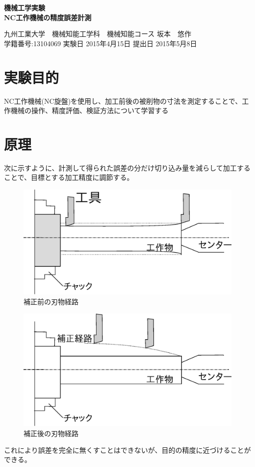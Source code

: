 \documentclass[a4j,twoside,openright,11pt]{jsarticle}
\begin{document}
\begin{screen}
\huge
\begin{center}
{\bf 機械工学実験\\NC工作機械の精度誤差計測}\\
\end{center}

\normalsize
\begin{flushright}
九州工業大学　機械知能工学科　機械知能コース  坂本　悠作\\学籍番号:13104069 \hspace{0.2in}実験日 2015年4月15日  提出日 2015年5月8日
\end{flushright}
\end{screen}


\section{実験目的}
NC工作機械(NC旋盤)を使用し、加工前後の被削物の寸法を測定することで、工作機械の操作、精度評価、検証方法について学習する
\section{原理}
次に示すように、計測して得られた誤差の分だけ切り込み量を減らして加工することで、目標とする加工精度に調節する。
\begin{figure}[htbp]
\begin{center}
\includegraphics[width=12cm]{hoseimae.eps}
\end{center}
\caption{補正前の刃物経路}
\end{figure}
\begin{figure}[htbp]
\begin{center}
\includegraphics[width=12cm]{hoseigo.eps}
\end{center}
\caption{補正後の刃物経路}
\end{figure}
これにより誤差を完全に無くすことはできないが、目的の精度に近づけることができる。
\newpage
\end{document}
